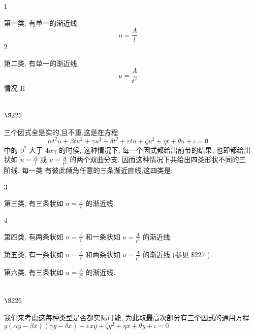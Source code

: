 1

第一类, 有单一的渐近线
\[
u=\frac{A}{t}
\]
2

第二类, 有单一的渐近线
\[
u=\frac{A}{t^{2}}
\]
情况 II

\section{$\S 225$}

三个因式全是实的,且不重,这是在方程
\[
\alpha t^{2} u+\beta t u^{2}+\gamma u^{3}+\delta t^{2}+\varepsilon t u+\zeta u^{2}+\eta t+\theta u+\iota=0
\]
中的 $\beta^{2}$ 大于 $4 \alpha \gamma$ 的时候, 这种情况下, 每一个因式都给出前节的结果, 也即都给出状如 $u=\frac{A}{t}$ 或 $u=\frac{A}{t^{2}}$ 的两个双曲分支. 因而这种情况下共给出四类形状不同的三阶线. 每一类 有彼此倾角任意的三条渐近直线,这四类是:

3

第三类, 有三条状如 $u=\frac{A}{t}$ 的渐近线.

4

第四类, 有两条状如 $u=\frac{A}{t}$ 和一条状如 $u=\frac{A}{t^{2}}$ 的渐近线.

第五类, 有一条状如 $u=\frac{A}{t}$ 和两条状如 $u=\frac{A}{t^{2}}$ 的渐近线 (参见 $\$ 227$ ).

第六类, 有三条状如 $u=\frac{A}{t^{2}}$ 的渐近线.

\section{$\S 226$}

我们来考虑这每种类型是否都实际可能, 为此取最高次部分有三个因式的通用方程 $y(\alpha y-\beta x)(\gamma y-\delta x)+\varepsilon x y+\zeta y^{2}+\eta x+\theta y+\iota=0$


